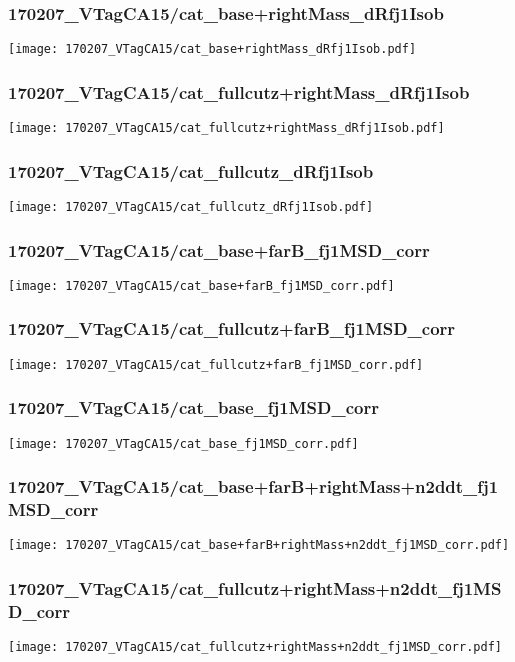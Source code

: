 \begin{frame}
   \frametitle{\small 170207\_VTagCA15/cat\_base+rightMass\_dRfj1Isob}
   \centering
   \texttt{[image: 170207\_VTagCA15/cat\_base+rightMass\_dRfj1Isob.pdf]}
\end{frame}

\begin{frame}
   \frametitle{\small 170207\_VTagCA15/cat\_fullcutz+rightMass\_dRfj1Isob}
   \centering
   \texttt{[image: 170207\_VTagCA15/cat\_fullcutz+rightMass\_dRfj1Isob.pdf]}
\end{frame}

\begin{frame}
   \frametitle{\small 170207\_VTagCA15/cat\_fullcutz\_dRfj1Isob}
   \centering
   \texttt{[image: 170207\_VTagCA15/cat\_fullcutz\_dRfj1Isob.pdf]}
\end{frame}

\begin{frame}
   \frametitle{\small 170207\_VTagCA15/cat\_base+farB\_fj1MSD\_corr}
   \centering
   \texttt{[image: 170207\_VTagCA15/cat\_base+farB\_fj1MSD\_corr.pdf]}
\end{frame}

\begin{frame}
   \frametitle{\small 170207\_VTagCA15/cat\_fullcutz+farB\_fj1MSD\_corr}
   \centering
   \texttt{[image: 170207\_VTagCA15/cat\_fullcutz+farB\_fj1MSD\_corr.pdf]}
\end{frame}

\begin{frame}
   \frametitle{\small 170207\_VTagCA15/cat\_base\_fj1MSD\_corr}
   \centering
   \texttt{[image: 170207\_VTagCA15/cat\_base\_fj1MSD\_corr.pdf]}
\end{frame}

\begin{frame}
   \frametitle{\small 170207\_VTagCA15/cat\_base+farB+rightMass+n2ddt\_fj1MSD\_corr}
   \centering
   \texttt{[image: 170207\_VTagCA15/cat\_base+farB+rightMass+n2ddt\_fj1MSD\_corr.pdf]}
\end{frame}

\begin{frame}
   \frametitle{\small 170207\_VTagCA15/cat\_fullcutz+rightMass+n2ddt\_fj1MSD\_corr}
   \centering
   \texttt{[image: 170207\_VTagCA15/cat\_fullcutz+rightMass+n2ddt\_fj1MSD\_corr.pdf]}
\end{frame}

